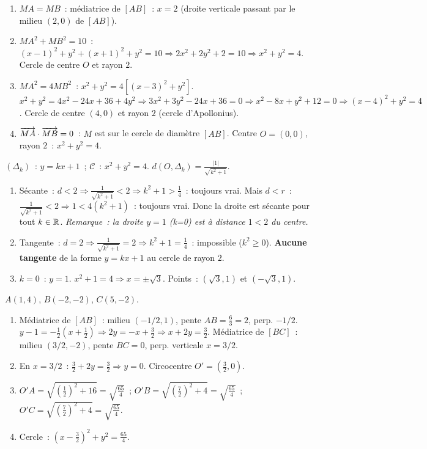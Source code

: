 
\begin{enumerate}
  \item $MA=MB$~: m\'ediatrice de $[AB]$~: $x=2$ (droite verticale passant par le milieu $(2,0)$ de $[AB]$).
  \item $MA^2+MB^2=10$~: $(x-1)^2+y^2+(x+1)^2+y^2=10\Rightarrow2x^2+2y^2+2=10\Rightarrow x^2+y^2=4$.
        Cercle de centre $O$ et rayon $2$.
  \item $MA^2=4MB^2$~: $x^2+y^2=4[(x-3)^2+y^2]$.
        $x^2+y^2=4x^2-24x+36+4y^2\Rightarrow3x^2+3y^2-24x+36=0\Rightarrow x^2-8x+y^2+12=0\Rightarrow(x-4)^2+y^2=4$.
        Cercle de centre $(4,0)$ et rayon $2$ (cercle d'Apollonius).
  \item $\overrightarrow{MA}\cdot\overrightarrow{MB}=0$~: $M$ est sur le cercle de diam\`etre $[AB]$.
        Centre $O=(0,0)$, rayon $2$~: $x^2+y^2=4$.
\end{enumerate}


$(\Delta_k)$~: $y=kx+1$~; $\mathcal{C}$~: $x^2+y^2=4$.
$d(O,\Delta_k)=\frac{|1|}{\sqrt{k^2+1}}$.
\begin{enumerate}
  \item S\'ecante~: $d<2\Rightarrow\frac{1}{\sqrt{k^2+1}}<2\Rightarrow k^2+1>\frac{1}{4}$~: toujours vrai.
        Mais $d<r$~: $\frac{1}{\sqrt{k^2+1}}<2\Rightarrow1<4(k^2+1)$~: toujours vrai.
        Donc la droite est s\'ecante pour tout $k\in\mathbb{R}$.
        \emph{Remarque~: la droite $y=1$ (k=0) est \`a distance $1<2$ du centre.}
  \item Tangente~: $d=2\Rightarrow\frac{1}{\sqrt{k^2+1}}=2\Rightarrow k^2+1=\frac{1}{4}$~: impossible ($k^2\geq0$).
        \textbf{Aucune tangente} de la forme $y=kx+1$ au cercle de rayon $2$.
  \item $k=0$~: $y=1$. $x^2+1=4\Rightarrow x=\pm\sqrt{3}$. Points~: $(\sqrt{3},1)$ et $(-\sqrt{3},1)$.
\end{enumerate}


$A(1,4)$, $B(-2,-2)$, $C(5,-2)$.
\begin{enumerate}
  \item M\'ediatrice de $[AB]$~: milieu $(-1/2,1)$, pente $AB=\frac{6}{3}=2$, perp. $-1/2$.
        $y-1=-\frac{1}{2}(x+\frac{1}{2})\Rightarrow2y=-x+\frac{3}{2}\Rightarrow x+2y=\frac{3}{2}$.
        M\'ediatrice de $[BC]$~: milieu $(3/2,-2)$, pente $BC=0$, perp. verticale $x=3/2$.
  \item En $x=3/2$~: $\frac{3}{2}+2y=\frac{3}{2}\Rightarrow y=0$. Circocentre $O'=(\frac{3}{2},0)$.
  \item $O'A=\sqrt{(\frac{1}{2})^2+16}=\sqrt{\frac{65}{4}}$~;
        $O'B=\sqrt{(\frac{7}{2})^2+4}=\sqrt{\frac{65}{4}}$~;
        $O'C=\sqrt{(\frac{7}{2})^2+4}=\sqrt{\frac{65}{4}}$.\checkmark
  \item Cercle~: $(x-\frac{3}{2})^2+y^2=\frac{65}{4}$.
\end{enumerate}

